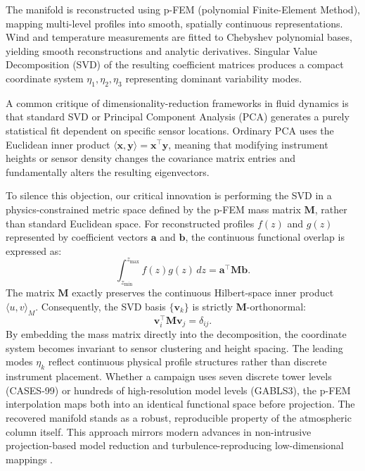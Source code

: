 \documentclass[12pt,a4paper]{article}
\newcommand{\vect}[1]{\mathbf{#1}}
\newcommand{\mat}[1]{\mathbf{#1}}
\begin{document}
The manifold is reconstructed using p-FEM (polynomial Finite-Element Method), mapping multi-level profiles into smooth, spatially continuous representations. Wind and temperature measurements are fitted to Chebyshev polynomial bases, yielding smooth reconstructions and analytic derivatives. Singular Value Decomposition (SVD) of the resulting coefficient matrices produces a compact coordinate system $\eta_1, \eta_2, \eta_3$ representing dominant variability modes.

A common critique of dimensionality-reduction frameworks in fluid dynamics is that standard SVD or Principal Component Analysis (PCA) generates a purely statistical fit dependent on specific sensor locations. Ordinary PCA uses the Euclidean inner product $\langle \vect{x}, \vect{y}\rangle = \vect{x}^\top \vect{y}$, meaning that modifying instrument heights or sensor density changes the covariance matrix entries and fundamentally alters the resulting eigenvectors.

To silence this objection, our critical innovation is performing the SVD in a physics-constrained metric space defined by the p-FEM mass matrix $\mat{M}$, rather than standard Euclidean space. For reconstructed profiles $f(z)$ and $g(z)$ represented by coefficient vectors $\vect{a}$ and $\vect{b}$, the continuous functional overlap is expressed as:
\begin{equation}
\int_{z_{\text{min}}}^{z_{\text{max}}} f(z)g(z)\,dz = \vect{a}^\top \mat{M} \vect{b}.
\end{equation}
The matrix $\mat{M}$ exactly preserves the continuous Hilbert-space inner product $\langle u,v \rangle_M$. Consequently, the SVD basis $\{\vect{v}_k\}$ is strictly $\mat{M}$-orthonormal:
\begin{equation}
\vect{v}_i^\top \mat{M} \vect{v}_j = \delta_{ij}.
\end{equation}
By embedding the mass matrix directly into the decomposition, the coordinate system becomes invariant to sensor clustering and height spacing. The leading modes $\eta_k$ reflect continuous physical profile structures rather than discrete instrument placement. Whether a campaign uses seven discrete tower levels (CASES-99) or hundreds of high-resolution model levels (GABLS3), the p-FEM interpolation maps both into an identical functional space before projection. The recovered manifold stands as a robust, reproducible property of the atmospheric column itself. This approach mirrors modern advances in non-intrusive projection-based model reduction and turbulence-reproducing low-dimensional mappings \citep{peherstorfer2016, shimizu2017}.
\end{document}
